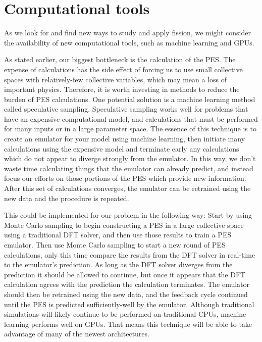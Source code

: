 

\section{Computational tools}
As we look for and find new ways to study and apply fission, we might consider the availability of new computational tools, such as machine learning and GPUs.

As stated earlier, our biggest bottleneck is the calculation of the PES. The expense of calculations has the side effect of forcing us to use small collective spaces with relatively-few collective variables, which may mean a loss of important physics. Therefore, it is worth investing in methods to reduce the burden of PES calculations. One potential solution is a machine learning method called speculative sampling. Speculative sampling works well for problems that have an expensive computational model, and calculations that must be performed for many inputs or in a large parameter space. The essence of this technique is to create an emulator for your model using machine learning, then initiate many calculations using the expensive model and terminate early any calculations which do not appear to diverge strongly from the emulator. In this way, we don't waste time calculating things that the emulator can already predict, and instead focus our efforts on those portions of the PES which provide new information. After this set of calculations converges, the emulator can be retrained using the new data and the procedure is repeated.

This could be implemented for our problem in the following way: Start by using Monte Carlo sampling to begin constructing a PES in a large collective space using a traditional DFT solver, and then use those results to train a PES emulator. Then use Monte Carlo sampling to start a new round of PES calculations, only this time compare the results from the DFT solver in real-time to the emulator's prediction. As long as the DFT solver diverges from the prediction it should be allowed to continue, but once it appears that the DFT calculation agrees with the prediction the calculation terminates. The emulator should then be retrained using the new data, and the feedback cycle continued until the PES is predicted sufficiently-well by the emulator. Although traditional simulations will likely continue to be performed on traditional CPUs, machine learning performs well on GPUs. That means this technique will be able to take advantage of many of the newest architectures.

